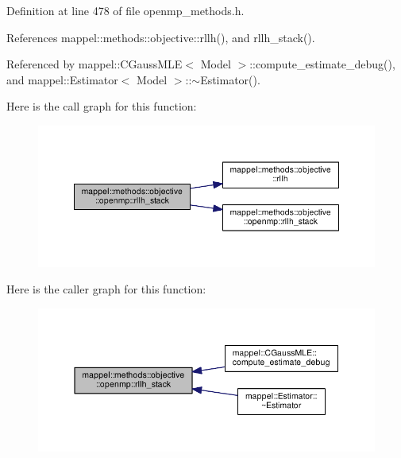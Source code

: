 Definition at line 478 of file openmp\+\_\+methods.\+h.



References mappel\+::methods\+::objective\+::rllh(), and rllh\+\_\+stack().



Referenced by mappel\+::\+C\+Gauss\+M\+L\+E$<$ Model $>$\+::compute\+\_\+estimate\+\_\+debug(), and mappel\+::\+Estimator$<$ Model $>$\+::$\sim$\+Estimator().



Here is the call graph for this function\+:\nopagebreak
\begin{figure}[H]
\begin{center}
\leavevmode
\includegraphics[width=350pt]{namespacemappel_1_1methods_1_1objective_1_1openmp_a8223d746bf91530f8cff4ec168e50b1d_cgraph}
\end{center}
\end{figure}




Here is the caller graph for this function\+:\nopagebreak
\begin{figure}[H]
\begin{center}
\leavevmode
\includegraphics[width=350pt]{namespacemappel_1_1methods_1_1objective_1_1openmp_a8223d746bf91530f8cff4ec168e50b1d_icgraph}
\end{center}
\end{figure}


